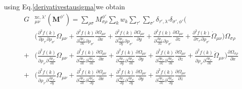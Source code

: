 \documentclass[preprint,preprintnumbers,amsmath,amssymb,11pt]{revtex4}
\def\xc{\textrm{xc}}
\begin{document}
using Eq.\eqref{derivativestausigma}we obtain
\begin{eqnarray}
&G&^{\xc,\lambda'}_{\mu \nu}( \textbf{M}^{\phi'} )=  \sum_{\rho \sigma} M^{\phi'}_{ \sigma \rho} \sum_{k} w_{k} \sum_{\tau'}\sum_{\sigma'} \delta_{\tau',\lambda'}\delta_{\sigma',\phi'} \biggl(\\
& \phantom{=} &\biggl( \frac{\partial^{2} f(k)}{\partial \rho_{\tau'} \partial \rho_{\sigma'}} \Omega_{\mu \nu}
+ \frac{\partial^{2} f(k)}{\partial \frac{\partial \rho_{\tau'}}{\partial x} \partial \rho_{\sigma'}} \frac{\partial \Omega_{\mu \nu}}{\partial x}
+ \frac{\partial^{2} f(k)}{\partial \frac{\partial \rho_{\tau'}}{\partial y} \partial \rho_{\sigma'}} \frac{\partial \Omega_{\mu \nu}}{\partial y}
+ \frac{\partial^{2} f(k)}{\partial \frac{\partial \rho_{\tau'}}{\partial z} \partial \rho_{\sigma'}} \frac{\partial \Omega_{\mu \nu}}{\partial z}
+ \frac{\partial^{2} f(k)}{\partial \tau_{\tau'} \partial \rho_{\sigma'}} \dot{\Omega}_{\mu \nu}
\biggr)  \Omega_{\sigma \rho }\nonumber\\
&+&\biggl( \frac{\partial^{2} f(k)}{\partial \rho_{\tau'} \partial \frac{\partial \rho_{\sigma'}}{\partial x}} \Omega_{\mu \nu} 
+ \frac{\partial^{2} f(k)}{\partial \frac{\partial \rho_{\tau'}}{\partial x} \partial \frac{\partial \rho_{\sigma'}}{\partial x}} \frac{\partial \Omega_{\mu \nu}}{\partial x}
+ \frac{\partial^{2} f(k)}{\partial \frac{\partial \rho_{\tau'}}{\partial y} \partial \frac{\partial \rho_{\sigma'}}{\partial x}} \frac{\partial \Omega_{\mu \nu}}{\partial y}
+ \frac{\partial^{2} f(k)}{\partial \frac{\partial \rho_{\tau'}}{\partial z} \partial \frac{\partial \rho_{\sigma'}}{\partial x}} \frac{\partial \Omega_{\mu \nu}}{\partial z} 
+ \frac{\partial^{2} f(k)}{\partial \rho_{\tau'} \partial \frac{\partial \rho_{\sigma'}}{\partial x}} \dot{\Omega}_{\mu \nu}
\biggr)  \frac{\partial \Omega_{\sigma \rho}}{\partial x} \nonumber\\
&+&\biggl( \frac{\partial^{2} f(k)}{\partial \rho_{\tau'} \partial \frac{\partial \rho_{\sigma'}}{\partial y}} \Omega_{\mu \nu} 
+ \frac{\partial^{2} f(k)}{\partial \frac{\partial \rho_{\tau'}}{\partial x} \partial \frac{\partial \rho_{\sigma'}}{\partial y}} \frac{\partial \Omega_{\mu \nu}}{\partial x}
+ \frac{\partial^{2} f(k)}{\partial \frac{\partial \rho_{\tau'}}{\partial y} \partial \frac{\partial \rho_{\sigma'}}{\partial y}} \frac{\partial \Omega_{\mu \nu}}{\partial y}
+ \frac{\partial^{2} f(k)}{\partial \frac{\partial \rho_{\tau'}}{\partial z} \partial \frac{\partial \rho_{\sigma'}}{\partial y}} \frac{\partial \Omega_{\mu \nu}}{\partial z}

\end{eqnarray}
\end{document}
